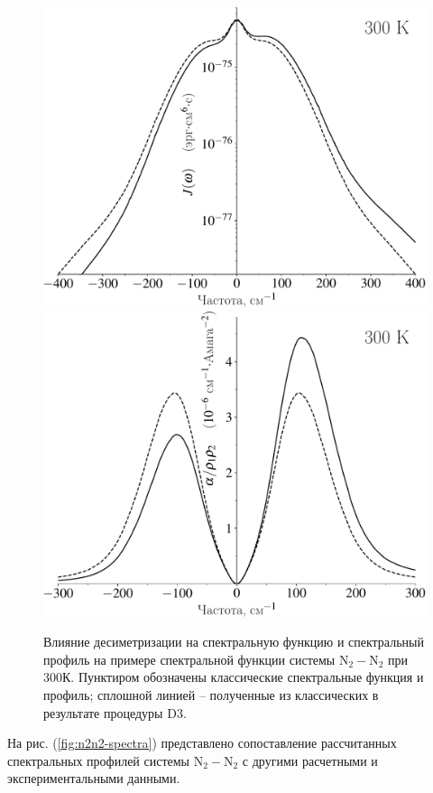 \begin{figure}[H]
    \centering
    \includegraphics[width=0.49\linewidth]{./pictures/polyatom_spectra/n2n2_spectral_function_300K-crop.pdf}
    \includegraphics[width=0.49\linewidth]{./pictures/polyatom_spectra/n2n2_desymmetrization-crop.pdf}
    \caption{Влияние десиметризации на спектральную функцию и спектральный профиль на примере спектральной функции системы N$_2-$N$_2$ при 300К. Пунктиром обозначены классические спектральные функция и профиль; сплошной линией -- полученные из классических в результате процедуры D3.}
    \label{fig:n2n2-desymmetrization}
\end{figure}

На рис. (\ref{fig:n2n2-spectra}) представлено сопоставление рассчитанных спектральных профилей системы N$_2-$N$_2$ с другими расчетными и экспериментальными данными.


